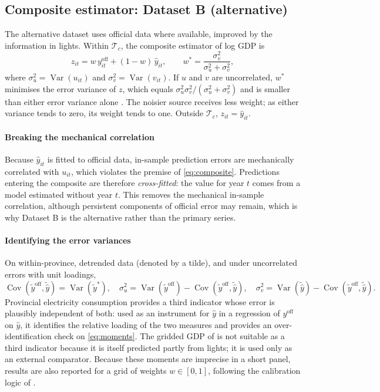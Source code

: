 \documentclass[11pt,a4paper]{article}
\newcommand{\Var}{\operatorname{Var}}
\newcommand{\Cov}{\operatorname{Cov}}
\begin{document}
\subsection{Composite estimator: Dataset B (alternative)}\label{sec:datasetB}

The alternative dataset uses official data where available, improved by the information in lights. Within $\mathcal{T}_c$, the composite estimator of log GDP is
\begin{equation}
z_{it} = w\, y^{\text{off}}_{it} + (1-w)\,\hat y_{it},\qquad
w^{*}=\frac{\sigma^2_v}{\sigma^2_u+\sigma^2_v},
\label{eq:composite}
\end{equation}
where $\sigma^2_u=\Var(u_{it})$ and $\sigma^2_v=\Var(v_{it})$. If $u$ and $v$ are uncorrelated, $w^{*}$ minimises the error variance of $z$, which equals $\sigma^2_u\sigma^2_v/(\sigma^2_u+\sigma^2_v)$ and is smaller than either error variance alone \citep{ChenNordhaus2011,HendersonStoreygardWeil2012}. The noisier source receives less weight; as either variance tends to zero, its weight tends to one. Outside $\mathcal{T}_c$, $z_{it}=\hat y_{it}$.

\paragraph{Breaking the mechanical correlation}
Because $\hat y_{it}$ is fitted to official data, in-sample prediction errors are mechanically correlated with $u_{it}$, which violates the premise of \eqref{eq:composite}. Predictions entering the composite are therefore \emph{cross-fitted}: the value for year $t$ comes from a model estimated without year $t$. This removes the mechanical in-sample correlation, although persistent components of official error may remain, which is why Dataset B is the alternative rather than the primary series.

\paragraph{Identifying the error variances}
On within-province, detrended data (denoted by a tilde), and under uncorrelated errors with unit loadings,
\begin{equation}
\Cov(\tilde y^{\text{off}},\tilde{\hat y})=\Var(\tilde y^{*}),\quad
\sigma^2_u=\Var(\tilde y^{\text{off}})-\Cov(\tilde y^{\text{off}},\tilde{\hat y}),\quad
\sigma^2_v=\Var(\tilde{\hat y})-\Cov(\tilde y^{\text{off}},\tilde{\hat y}).
\label{eq:moments}
\end{equation}
Provincial electricity consumption provides a third indicator whose error is plausibly independent of both: used as an instrument for $\hat y$ in a regression of $y^{\text{off}}$ on $\hat y$, it identifies the relative loading of the two measures and provides an over-identification check on \eqref{eq:moments}. The gridded GDP of \citet{RossiHansbergZhang2025} is not suitable as a third indicator because it is itself predicted partly from lights; it is used only as an external comparator. Because these moments are imprecise in a short panel, results are also reported for a grid of weights $w\in[0,1]$, following the calibration logic of \citet{HendersonStoreygardWeil2012}.
\end{document}

